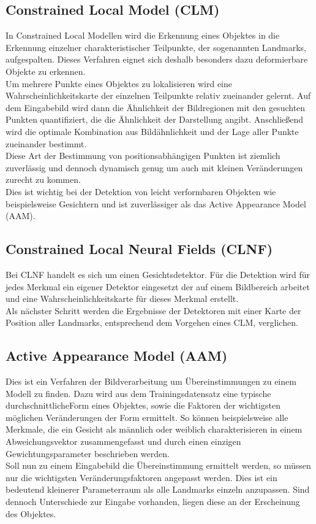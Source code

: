 \subsection{Constrained Local Model (CLM)}
In Constrained Local Modellen wird die Erkennung eines Objektes in die Erkennung einzelner charakteristischer Teilpunkte, der sogenannten Landmarks, aufgespalten. Dieses Verfahren eignet sich deshalb besonders dazu deformierbare Objekte zu erkennen.\\
Um mehrere Punkte eines Objektes zu lokalisieren wird eine Wahrscheinlichkeitskarte der einzelnen Teilpunkte relativ zueinander gelernt. Auf dem Eingabebild wird dann die Ähnlichkeit der Bildregionen mit den gesuchten Punkten quantifiziert, die die Ähnlichkeit der Darstellung angibt. Anschließend wird die optimale Kombination aus Bildähnlichkeit und der Lage aller Punkte zueinander bestimmt.\\
Diese Art der Bestimmung von positionsabhängigen Punkten ist ziemlich zuverlässig und dennoch dynamisch genug um auch mit kleinen Veränderungen zurecht zu kommen.\\
Dies ist wichtig bei der Detektion von leicht verformbaren Objekten wie beispielsweise Gesichtern und ist zuverlässiger als das Active Appearance Model (AAM).
\cite{pdf_CLM}
\newpage
\subsection{Constrained Local Neural Fields (CLNF)}
Bei CLNF handelt es sich um einen Gesichtsdetektor. Für die Detektion wird für jedes Merkmal ein eigener Detektor eingesetzt der auf einem Bildbereich arbeitet und eine Wahrscheinlichkeitskarte für dieses Merkmal erstellt.\\
Als nächster Schritt werden die Ergebnisse der Detektoren mit einer Karte der Position aller Landmarks, entsprechend dem Vorgehen eines CLM, verglichen.
\cite{CLNF}
\subsection{Active Appearance Model (AAM)}
Dies ist ein Verfahren der Bildverarbeitung um Übereinstimmungen zu einem Modell zu finden. Dazu wird aus dem Trainingsdatensatz eine typische \glqq durchschnittliche\grqq Form eines Objektes, sowie die Faktoren der wichtigsten möglichen Veränderungen der Form ermittelt. So können beispielsweise alle Merkmale, die ein Gesicht als männlich oder weiblich charakterisieren in einem Abweichungsvektor zusammengefasst und durch einen einzigen Gewichtungsparameter beschrieben werden.\\
Soll nun zu einem Eingabebild die Übereinstimmung ermittelt werden, so müssen nur die wichtigsten Veränderungsfaktoren angepasst werden. Dies ist ein bedeutend kleinerer Parameterraum als alle Landmarks einzeln anzupassen. Sind dennoch Unterschiede zur Eingabe vorhanden, liegen diese an der Erscheinung des Objektes.
\cite{wiki_AAM}
